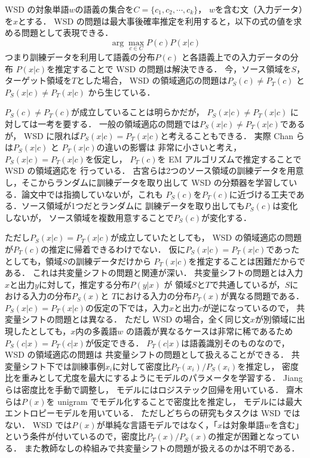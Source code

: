 \documentclass[japanese]{jnlp_1.4}
\begin{document}
WSD の対象単語\( w\)の語義の集合を\( C = \{c_1,c_2,\cdots,c_k \}\)，
\( w\)を含む文（入力データ）を\( x \)とする．
WSD の問題は最大事後確率推定を利用すると，以下の式の値を求める問題として表現できる．
\[
\arg \max_{c \in C } P(c) P(x|c)
\]
つまり訓練データを利用して語義の分布\( P(c) \) と各語義上での入力データの分布
\( P(x|c) \)を推定することで WSD の問題は解決できる．
今，ソース領域を\( S\)，ターゲット領域を\( T\)とした場合，
WSD の領域適応の問題は\( P_S (c) \ne P_T (c)\) と
\( P_S (x|c) \ne P_T (x|c)\) から生じている．

\( P_S (c) \ne P_T (c)\)が成立していることは明らかだが，
\( P_S (x|c) \ne P_T (x|c)\) に対しては一考を要する．
一般の領域適応の問題では\( P_S (x|c) \ne P_T (x|c)\)であるが，
WSD に限れば\( P_S (x|c) = P_T (x|c)\)と考えることもできる．
実際 Chan らは\( P_S (x|c) \) と \( P_T (x|c)\)の違いの影響は
非常に小さいと考え，\( P_S (x|c) = P_T (x|c)\)を仮定し，
\( P_T (c)\)を EM アルゴリズムで推定することで WSD の領域適応を
行っている\cite{chan2005word,chan2006estimating}．
古宮らは2つのソース領域の訓練データを用意し，そこからランダムに訓練データを取り出して
WSD の分類器を学習している\cite{komiya-nenji2013}．論文中では指摘していないが，これも
\( P_S (c)\)を\( P_T (c)\)に近づける工夫である．ソース領域が1つだとランダムに
訓練データを取り出しても\( P_S (c)\)は変化しないが，
ソース領域を複数用意することで\( P_S (c)\)が変化する．

ただし\( P_S (x|c) = P_T (x|c)\)が成立していたとしても，
WSD の領域適応の問題が\( P_T (c)\)の推定に帰着できるわけでない．
仮に\( P_S (x|c) = P_T (x|c)\)であったとしても，領域\( S \)の訓練データだけから
\( P_T (x|c)\)を推定することは困難だからである．
これは共変量シフトの問題\cite{shimodaira2000improving,sugiyama-2006-09-05}と関連が深い．
共変量シフトの問題とは入力\( x \)と出力\( y \)に対して，推定する分布\( P(y|x)\) が
領域\( S \)と\( T \)で共通しているが，\( S \)における入力の分布\( P_S(x) \)と
\( T \)における入力の分布\( P_T(x) \)が異なる問題である．
\( P_S (x|c) = P_T (x|c)\)の仮定の下では，入力\( x \)と出力\( c \)が逆になっているので，
共変量シフトの問題とは異なる．
ただし WSD の場合，全く同じ文\( x \)が別領域に出現したとしても，\( x \)内の多義語\( w \)
の語義が異なるケースは非常に稀であるため\( P_S (c|x) = P_T (c|x)\)が仮定できる．
\( P_T (c|x)\)は語義識別そのものなので，WSD の領域適応の問題は
共変量シフトの問題として扱えることができる．
共変量シフト下では訓練事例\( x_i \)に対して密度比\( P_T(x_i)/P_S(x_i) \)を推定し，
密度比を重みとして尤度を最大にするようにモデルのパラメータを学習する．
Jiang らは密度比を手動で調整し，
モデルにはロジステック回帰を用いている\cite{jiang2007instance}．
齋木らは\( P(x) \)を unigram でモデル化することで密度比を推定し，
モデルには最大エントロピーモデルを用いている\cite{saiki-2008-03-27}．
ただしどちらの研究もタスクは WSD ではない．
WSD では\( P(x) \)が単純な言語モデルではなく，「\( x \)は対象単語\( w \)を含む」
という条件が付いているので，密度比\( P_T(x)/P_S(x) \)の推定が困難となっている．
また教師なしの枠組みで共変量シフトの問題が扱えるのかは不明である．
\end{document}
